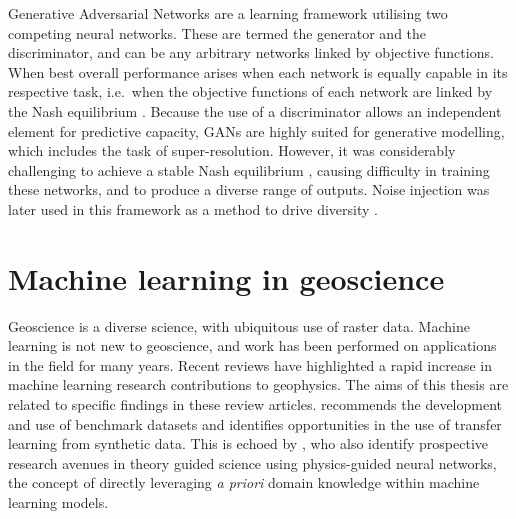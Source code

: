\documentclass[manuscript.tex]{subfiles}
\begin{document}
Generative Adversarial Networks \parencite{goodfellowGenerativeAdversarialNets2014} are a learning framework utilising two competing neural networks.
These are termed the generator and the discriminator, and can be any arbitrary networks linked by objective functions.
When best overall performance arises when each network is equally capable in its respective task, i.e.\ when the objective functions of each network are linked by the Nash equilibrium \parencite{salimansImprovedTechniquesTraining2016,lucicAreGANsCreated2018}.
Because the use of a discriminator allows an independent element for predictive capacity, GANs are highly suited for generative modelling, which includes the task of super-resolution.
However, it was considerably challenging to achieve a stable Nash equilibrium \parencite{salimansImprovedTechniquesTraining2016}, causing difficulty in training these networks, and to produce a diverse range of outputs.
Noise injection was later used in this framework as a method to drive diversity \parencite{karrasStylebasedGeneratorArchitecture2018,rakotonirinaESRGANFurtherImproving2020}.



\section{Machine learning in geoscience}
\label{sec:introgeoml}

Geoscience is a diverse science, with ubiquitous use of raster data.
Machine learning is not new to geoscience, and work has been performed on applications in the field for many years.
Recent reviews have highlighted a rapid increase in machine learning research contributions to geophysics.
The aims of this thesis are related to specific findings in these review articles.
\textcite{bergenMachineLearningDatadriven2019} recommends the development and use of benchmark datasets and identifies opportunities in the use of transfer learning from synthetic data.
This is echoed by \textcite{karpatneMachineLearningGeosciences2019}, who also identify prospective research avenues in theory guided science using physics-guided neural networks, the concept of directly leveraging \emph{a priori} domain knowledge within machine learning models.
\end{document}
